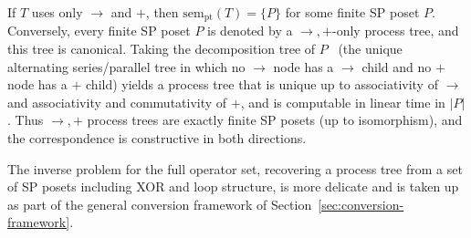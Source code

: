 \begin{corollary}\label{cor:pt-sp-iff}
  If $T$ uses only $\to$ and $+$, then $\mathrm{sem}_{\mathrm{pt}}(T)=\{P\}$ for some finite SP poset $P$.
  Conversely, every finite SP poset $P$ is denoted by a $\to,+$-only process tree, and this tree is canonical. Taking the decomposition tree of $P$~\cite{valdesRecognitionSeriesParallel1982,mohringComputationallyTractableClasses1989} (the unique alternating series/parallel tree in which no $\to$ node has a $\to$ child and no $+$ node has a $+$ child) yields a process tree that is unique up to associativity of $\to$ and associativity and commutativity of $+$, and is computable in linear time in $|P|$.
  Thus $\to,+$ process trees are exactly finite SP posets (up to isomorphism), and the correspondence is constructive in both directions.
\end{corollary}

The inverse problem for the full operator set, recovering a process tree from a set of SP posets including XOR and loop structure, is more delicate and is taken up as part of the general conversion framework of Section~\ref{sec:conversion-framework}.
